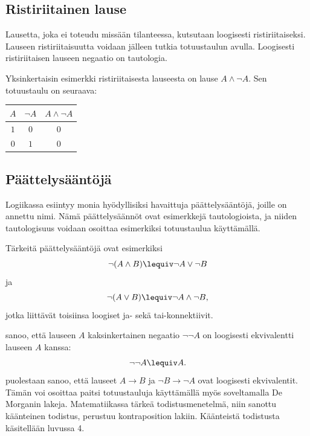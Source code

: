 \subsection*{Ristiriitainen lause} %
Lausetta, joka ei toteudu missään tilanteessa, kutsutaan loogisesti ristiriitaiseksi. Lauseen ristiriitaisuutta voidaan jälleen tutkia totuustaulun avulla. Loogisesti ristiriitaisen lauseen negaatio on tautologia. 

Yksinkertaisin esimerkki ristiriitaisesta lauseesta on lause $A\land \lnot A$. Sen totuustaulu on seuraava:

\bigskip

\begin{center}
\begin{tabular}{|c|c|c|}\hline
$A$ & $\lnot A$ & $A \land  \lnot A$ \\ \hline
$1$ & $0$ & $0$\\
$0$ & $1$ & $0$\\ \hline
\end{tabular}
\end{center}

\bigskip


\subsection*{Päättelysääntöjä} Logiikassa esiintyy monia hyödyllisiksi havaittuja päättelysääntöjä, joille on annettu nimi. Nämä päättelysäännöt ovat esimerkkejä tautologioista, ja niiden tautologisuus voidaan osoittaa esimerkiksi totuustaulua käyttämällä.

Tärkeitä päättelysääntöjä ovat esimerkiksi 
\[
\lnot(A \land B) \lequiv \lnot A \lor \lnot B
\]
ja
\[
\lnot(A \lor B) \lequiv \lnot A \land \lnot B,
\]
jotka liittävät toisiinsa loogiset ja- sekä tai-konnektiivit.

 sanoo, että lauseen $A$ kaksinkertainen negaatio $\lnot \lnot A$ on loogisesti ekvivalentti lauseen $A$ kanssa:
\[
\lnot \lnot A \lequiv A.
\]
 puolestaan sanoo, että lauseet $A\to B$ ja $\lnot B \to \lnot A$ ovat loogisesti ekvivalentit. Tämän voi osoittaa paitsi totuustauluja käyttämällä myös soveltamalla De Morganin lakeja.
Matematiikassa tärkeä todistusmenetelmä, niin sanottu käänteinen todistus, perustuu kontraposition lakiin. Käänteistä todistusta käsitellään luvussa 4.

